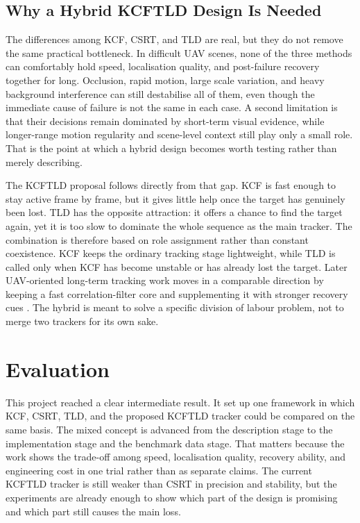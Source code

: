 \documentclass[12pt,a4paper]{article}
\begin{document}
\subsection{Why a Hybrid KCF\textendash TLD Design Is Needed}
The differences among KCF, CSRT, and TLD are real, but they do not remove the same practical bottleneck. In difficult UAV scenes, none of the three methods can comfortably hold speed, localisation quality, and post-failure recovery together for long. Occlusion, rapid motion, large scale variation, and heavy background interference can still destabilise all of them, even though the immediate cause of failure is not the same in each case. A second limitation is that their decisions remain dominated by short-term visual evidence, while longer-range motion regularity and scene-level context still play only a small role. That is the point at which a hybrid design becomes worth testing rather than merely describing.

The KCF\textendash TLD proposal follows directly from that gap. KCF is fast enough to stay active frame by frame, but it gives little help once the target has genuinely been lost. TLD has the opposite attraction: it offers a chance to find the target again, yet it is too slow to dominate the whole sequence as the main tracker. The combination is therefore based on role assignment rather than constant coexistence. KCF keeps the ordinary tracking stage lightweight, while TLD is called only when KCF has become unstable or has already lost the target. Later UAV-oriented long-term tracking work moves in a comparable direction by keeping a fast correlation-filter core and supplementing it with stronger recovery cues \cite{fan2022uav}. The hybrid is meant to solve a specific division of labour problem, not to merge two trackers for its own sake.

\section{Evaluation}
This project reached a clear intermediate result. It set up one framework in which KCF, CSRT, TLD, and the proposed KCF\textendash TLD tracker could be compared on the same basis. The mixed concept is advanced from the description stage to the implementation stage and the benchmark data stage. That matters because the work shows the trade-off among speed, localisation quality, recovery ability, and engineering cost in one trial rather than as separate claims. The current KCF\textendash TLD tracker is still weaker than CSRT in precision and stability, but the experiments are already enough to show which part of the design is promising and which part still causes the main loss.
\end{document}
